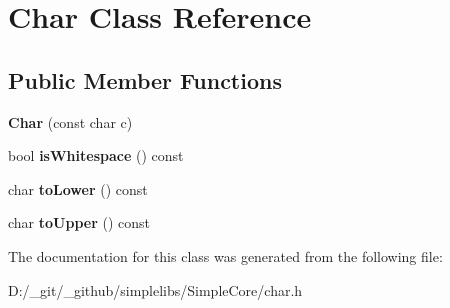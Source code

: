 \hypertarget{class_char}{}\section{Char Class Reference}
\label{class_char}
\subsection*{Public Member Functions}
\begin{DoxyCompactItemize}
\item 
\mbox{\label{class_char_acd2e802be49181c124db756086c96e99}} 
{\bfseries Char} (const char c)
\item 
\mbox{\label{class_char_af1d97d24976ce7976d29031395b51d48}} 
bool {\bfseries is\+Whitespace} () const
\item 
\mbox{\label{class_char_aa839c596bef79922eee2eda862a1f2d6}} 
char {\bfseries to\+Lower} () const
\item 
\mbox{\label{class_char_a14e76ebb8f3318fc93013bac1cb797b6}} 
char {\bfseries to\+Upper} () const
\end{DoxyCompactItemize}


The documentation for this class was generated from the following file\+:\begin{DoxyCompactItemize}
\item 
D\+:/\+\_\+git/\+\_\+github/simplelibs/\+Simple\+Core/char.\+h\end{DoxyCompactItemize}
